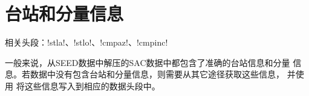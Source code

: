\section{台站和分量信息}
相关头段：!stla!、!stlo!、!cmpaz!、!cmpinc!

一般来说，从SEED数据中解压的SAC数据中都包含了准确的台站信息和分量
信息。若数据中没有包含台站和分量信息，则需要从其它途径获取这些信息，
并使用  将这些信息写入到相应的数据头段中。
